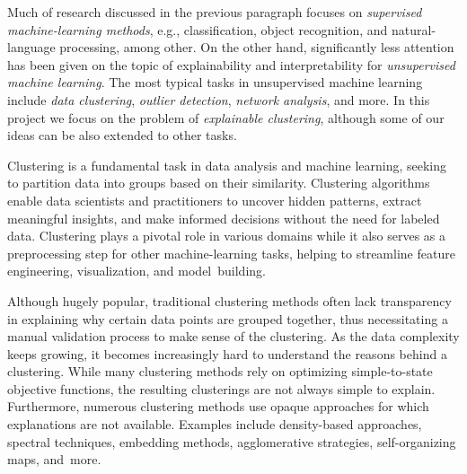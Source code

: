\documentclass[a4paper,11pt]{article}
\begin{document}

Much of research discussed in the previous paragraph focuses on \emph{supervised machine-learning methods}, 
e.g., classification, object recognition, and natural-language processing, among other.
On the other hand, significantly less attention has been given on the 
topic of explainability and interpretability for \emph{unsupervised machine learning}.
The most typical tasks in unsupervised machine learning include
\emph{data clustering}, \emph{outlier detection}, \emph{network analysis}, and more. 
In this project we focus on the problem of \emph{explainable clustering}, 
although some of our ideas can be also extended to other tasks.

Clustering is a fundamental task in data analysis and machine learning, 
seeking to partition data into groups based on their similarity.
Clustering algorithms enable data scientists and practitioners
to uncover hidden patterns, extract meaningful insights, 
and make informed decisions without the need for labeled data. 
Clustering plays a pivotal role in various domains
while it also serves as a preprocessing step for other machine-learning tasks, 
helping to streamline feature engineering, visualization, and model~building.

Although hugely popular, 
traditional clustering methods often lack transparency in explaining 
why certain data points are grouped together, 
thus necessitating a manual validation process to make sense of the clustering. 
As the data complexity keeps growing, 
it becomes increasingly hard to understand the reasons behind a clustering.
While many clustering methods rely on optimizing simple-to-state objective functions, 
the resulting clusterings are not always simple to explain. 
Furthermore, numerous clustering methods use opaque approaches
for which explanations are not available. 
Examples include density-based approaches, spectral techniques, embedding methods,  
agglomerative strategies, self-organizing maps, and~more.
\end{document}
